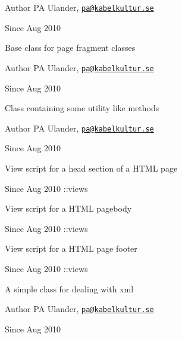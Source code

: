 \begin{DoxyAuthor}{Author}
P\-A Ulander, \href{mailto:pa@kabelkultur.se}{\tt pa@kabelkultur.\-se} 
\end{DoxyAuthor}
\begin{DoxySince}{Since}
Aug 2010
\end{DoxySince}
Base class for page fragment classes

\begin{DoxyAuthor}{Author}
P\-A Ulander, \href{mailto:pa@kabelkultur.se}{\tt pa@kabelkultur.\-se} 
\end{DoxyAuthor}
\begin{DoxySince}{Since}
Aug 2010
\end{DoxySince}
Class containing some utility like methods

\begin{DoxyAuthor}{Author}
P\-A Ulander, \href{mailto:pa@kabelkultur.se}{\tt pa@kabelkultur.\-se} 
\end{DoxyAuthor}
\begin{DoxySince}{Since}
Aug 2010
\end{DoxySince}
View script for a head section of a H\-T\-M\-L page

\begin{DoxySince}{Since}
Aug 2010 \-::views
\end{DoxySince}
View script for a H\-T\-M\-L pagebody

\begin{DoxySince}{Since}
Aug 2010 \-::views
\end{DoxySince}
View script for a H\-T\-M\-L page footer

\begin{DoxySince}{Since}
Aug 2010 \-::views
\end{DoxySince}
A simple class for dealing with xml

\begin{DoxyAuthor}{Author}
P\-A Ulander, \href{mailto:pa@kabelkultur.se}{\tt pa@kabelkultur.\-se} 
\end{DoxyAuthor}
\begin{DoxySince}{Since}
Aug 2010 
\end{DoxySince}
